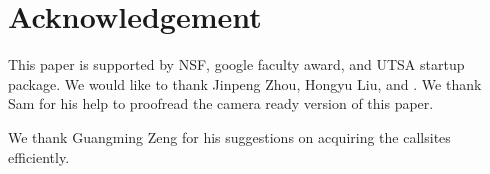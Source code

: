 \section{Acknowledgement}

This paper is supported by NSF, google faculty award, and UTSA startup package. 
We would like to thank Jinpeng Zhou, Hongyu Liu, and . We thank Sam for his help to proofread the camera ready version of this paper.  

We thank Guangming Zeng for his suggestions on acquiring the callsites efficiently. 